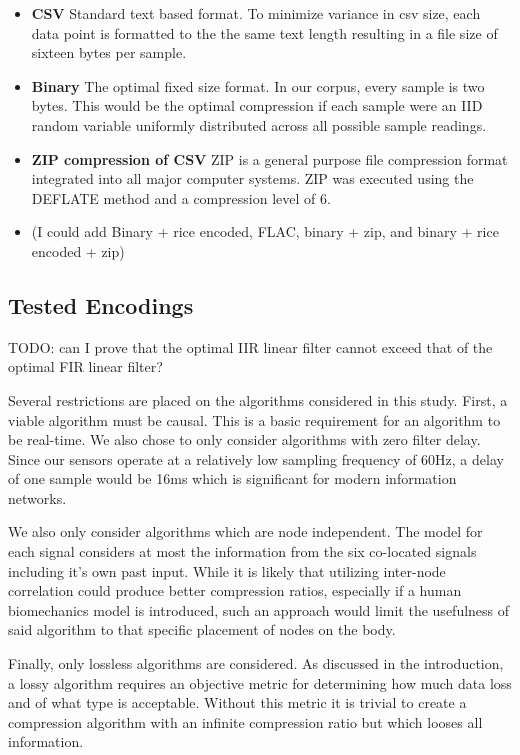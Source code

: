 \documentclass[journal]{IEEEtran}
\begin{document}
\begin{itemize}
  \item \textbf{CSV} Standard text based format. To minimize variance in csv size, each data point is formatted to the the same text length resulting in a file size of sixteen bytes per sample.
  \item \textbf{Binary} The optimal fixed size format. In our corpus, every sample is two bytes. This would be the optimal compression if each sample were an IID random variable uniformly distributed across all possible sample readings.
  \item \textbf{ZIP compression of CSV} ZIP is a general purpose file compression format integrated into all major computer systems. ZIP was executed using the DEFLATE method \cite{Deutsch1996} and a compression level of 6.
  \item (I could add Binary + rice encoded, FLAC, binary + zip, and binary + rice encoded + zip)
\end{itemize}
\subsection{Tested Encodings}

TODO: can I prove that the optimal IIR linear filter cannot exceed that of the optimal FIR linear filter?

Several restrictions are placed on the algorithms considered in this study. First, a viable algorithm must be causal. This is a basic requirement for an algorithm to be real-time. We also chose to only consider algorithms with zero filter delay. Since our sensors operate at a relatively low sampling frequency of 60Hz, a delay of one sample would be 16ms which is significant for modern information networks.

We also only consider algorithms which are node independent. The model for each signal considers at most the information from the six co-located signals including it's own past input. While it is likely that utilizing inter-node correlation could produce better compression ratios, especially if a human biomechanics model is introduced, such an approach would limit the usefulness of said algorithm to that specific placement of nodes on the body.

Finally, only lossless algorithms are considered. As discussed in the introduction, a lossy algorithm requires an objective metric for determining how much data loss and of what type is acceptable. Without this metric it is trivial to create a compression algorithm with an infinite compression ratio but which looses all information.
\end{document}
